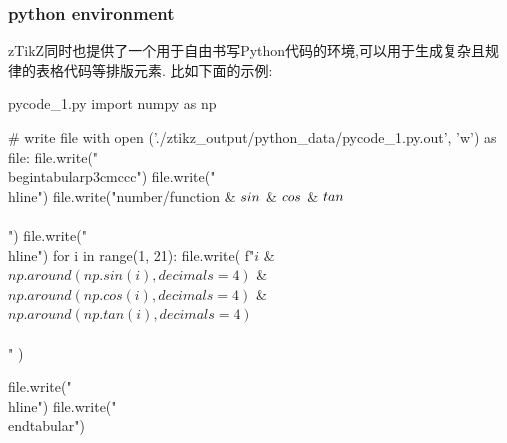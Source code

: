 \subsubsection{python environment}
zTikZ同时也提供了一个用于自由书写Python代码的环境,可以用于生成复杂且规律的表格代码等排版元素.
比如下面的示例:
\begin{codeprint}
\begin{pycode}{pycode_1.py}
import numpy as np


# write file
with open ('./ztikz_output/python_data/pycode_1.py.out', 'w') as file:
    file.write("\\begin{tabular}{p{3cm}ccc}\n")
    file.write("\\hline\n")
    file.write("number/function & $\\sin$ & $\\cos$ & $\\tan$\\\\\n")
    file.write("\\hline\n")
    for i in range(1, 21):
        file.write(
            f"${i}$ & ${np.around(np.sin(i), decimals=4)}$ &  ${np.around(np.cos(i), decimals=4)}$ & ${np.around(np.tan(i), decimals=4)}$\\\\\n"
        )

    file.write("\\hline\n")
    file.write("\\end{tabular}\n")
\end{pycode}
\end{codeprint}



